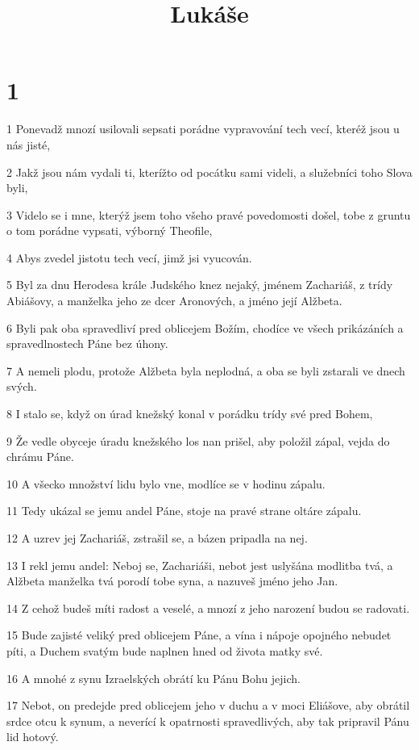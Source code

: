 

\title{Lukáše}

\chapter{1}

\par 1 Ponevadž mnozí usilovali sepsati porádne vypravování tech vecí, kteréž jsou u nás jisté,
\par 2 Jakž jsou nám vydali ti, kterížto od pocátku sami videli, a služebníci toho Slova byli,
\par 3 Videlo se i mne, kterýž jsem toho všeho pravé povedomosti došel, tobe z gruntu o tom porádne vypsati, výborný Theofile,
\par 4 Abys zvedel jistotu tech vecí, jimž jsi vyucován.
\par 5 Byl za dnu Herodesa krále Judského knez nejaký, jménem Zachariáš, z trídy Abiášovy, a manželka jeho ze dcer Aronových, a jméno její Alžbeta.
\par 6 Byli pak oba spravedliví pred oblicejem Božím, chodíce ve všech prikázáních a spravedlnostech Páne bez úhony.
\par 7 A nemeli plodu, protože Alžbeta byla neplodná, a oba se byli zstarali ve dnech svých.
\par 8 I stalo se, když on úrad knežský konal v porádku trídy své pred Bohem,
\par 9 Že vedle obyceje úradu knežského los nan prišel, aby položil zápal, vejda do chrámu Páne.
\par 10 A všecko množství lidu bylo vne, modlíce se v hodinu zápalu.
\par 11 Tedy ukázal se jemu andel Páne, stoje na pravé strane oltáre zápalu.
\par 12 A uzrev jej Zachariáš, zstrašil se, a bázen pripadla na nej.
\par 13 I rekl jemu andel: Neboj se, Zachariáši, nebot jest uslyšána modlitba tvá, a Alžbeta manželka tvá porodí tobe syna, a nazuveš jméno jeho Jan.
\par 14 Z cehož budeš míti radost a veselé, a mnozí z jeho narození budou se radovati.
\par 15 Bude zajisté veliký pred oblicejem Páne, a vína i nápoje opojného nebudet píti, a Duchem svatým bude naplnen hned od života matky své.
\par 16 A mnohé z synu Izraelských obrátí ku Pánu Bohu jejich.
\par 17 Nebot, on predejde pred oblicejem jeho v duchu a v moci Eliášove, aby obrátil srdce otcu k synum, a neverící k opatrnosti spravedlivých, aby tak pripravil Pánu lid hotový.
